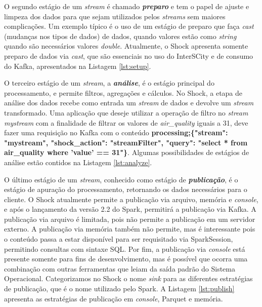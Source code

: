 

O segundo estágio de um \textit{stream} é chamado \textit{\textbf{preparo}} e tem o papel
de ajuste e limpeza dos dados para que sejam utilizados pelos \textit{streams}
sem maiores complicações. Um exemplo típico é o uso de um estágio de preparo
que faça \textit{cast} (mudanças nos tipos de dados) de dados, quando valores estão como
\textit{string} quando são necessários valores \textit{double}. Atualmente,
o Shock apresenta somente preparo de dados via \textit{cast}, que são essenciais
no uso do InterSCity e de consumo do Kafka, apresentados na Listagem
\ref{lst:setup}.



O terceiro estágio de um \textit{stream}, a \textit{\textbf{análise}}, é o
estágio principal do processamento, e permite filtros, agregações e cálculos.
No Shock, a etapa de análise dos dados recebe como entrada um \textit{stream}
de dados e devolve um \textit{stream} transformado. Uma aplicação que deseje
utilizar a operação de filtro no \textit{stream} \textit{mystream} com a finalidade
de filtrar os valores de \textit{air\_quality} iguais a 31, deve fazer uma
requisição no Kafka com o conteúdo \small{\textbf{processing;\{"stream": "mystream",
"shock\_action": "streamFilter", "query": "select * from air\_quality where
'value' == 31"\}}}. Algumas possibilidades de estágios de análise
estão contidos na Listagem \ref{lst:analyze}.



O último estágio de um \textit{stream}, conhecido como estágio de
\textit{\textbf{publicação}}, é o estágio
de apuração do processamento, retornando os dados necessários para o cliente.
O Shock atualmente permite a publicação via arquivo, memória e \textit{console}, e após o
lançamento da versão 2.2 do Spark, permitirá a publicação via Kafka. A
publicação via arquivo é limitada, pois não permite a publicação em um servidor
externo. A publicação via memória também não permite, mas é interessante pois
o conteúdo passa a estar disponível para ser requisitado via SparkSession,
permitindo consultas com sintaxe SQL. Por fim, a publicação via \textit{console} está
presente somente para fins de desenvolvimento, mas é possível que ocorra uma
combinação com outras ferramentas que leiam da saída padrão do Sistema Operacional.
Categorizamos no Shock o nome \textit{sink} para as diferentes estratégias de
publicação, que é o nome utilizado pelo Spark. A Listagem \ref{lst:publish}
apresenta as estratégias de publicação em \textit{console}, Parquet e memória.

